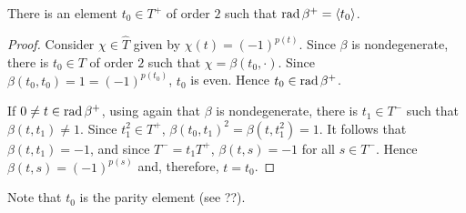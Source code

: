 \begin{prop}\label{prop:parity-element}
    There is an element $t_0 \in T^+$ of order $2$ such that $\operatorname{rad} \beta^+ = \langle t_0 \rangle$.
\end{prop}

\begin{proof}
    Consider $\chi \in \widehat{T}$ given by $\chi(t) = (-1)^{p(t)}$. 
    Since $\beta$ is nondegenerate, there is $t_0\in T$ of order $2$ such that $\chi = \beta(t_0, \cdot)$. 
    Since $\beta(t_0, t_0) = 1 = (-1)^{p(t_0)}$, $t_0$ is even. 
    Hence $t_0 \in \operatorname{rad} \beta^+$. 
    
    If $0 \neq t \in \operatorname{rad} \beta^+$, using again that $\beta$ is nondegenerate, there is $t_1 \in T^-$ such that $\beta(t, t_1) \neq 1$. 
    Since $t_1^2 \in T^+$, $\beta(t_0, t_1)^2 = \beta(t, t_1^2) = 1$. 
    It follows that $\beta(t, t_1) = -1$, and since $T^- = t_1 T^+$, $\beta(t, s) = -1$ for all $s\in T^-$. 
    Hence $\beta(t, s) = (-1)^{p(s)}$ and, therefore, $t = t_0$.
\end{proof}

\begin{remark}\label{rmk:t_0-is-parity}
    Note that $t_0$ is the parity element (see ??).
\end{remark}


    


